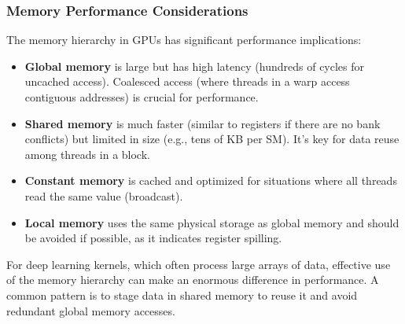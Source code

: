 \subsubsection{Memory Performance Considerations}

The memory hierarchy in GPUs has significant performance implications:

\begin{itemize}
    \item \textbf{Global memory} is large but has high latency (hundreds of cycles for uncached access). Coalesced access (where threads in a warp access contiguous addresses) is crucial for performance.
    
    \item \textbf{Shared memory} is much faster (similar to registers if there are no bank conflicts) but limited in size (e.g., tens of KB per SM). It's key for data reuse among threads in a block.
    
    \item \textbf{Constant memory} is cached and optimized for situations where all threads read the same value (broadcast).
    
    \item \textbf{Local memory} uses the same physical storage as global memory and should be avoided if possible, as it indicates register spilling.
\end{itemize}

For deep learning kernels, which often process large arrays of data, effective use of the memory hierarchy can make an enormous difference in performance. A common pattern is to stage data in shared memory to reuse it and avoid redundant global memory accesses.


